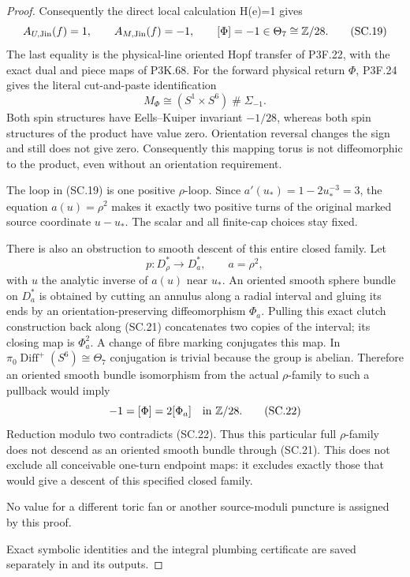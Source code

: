 \begin{proof}
Consequently the direct local calculation H(e)=1 gives
\[
 A_{U,\rm Jin}(f)=1,\qquad A_{M,\rm Jin}(f)=-1,
 \qquad[\Phi]=-1\in\Theta_7\cong\mathbb Z/28.          \tag{SC.19}
\]
The last equality is the physical-line oriented Hopf transfer of P3F.22, with the exact dual and piece maps of P3K.68. For the
forward physical return \(\Phi\), P3F.24 gives the literal cut-and-paste
identification
\[
 M_\Phi\cong(S^1\times S^6)\mathbin{\#}\Sigma_{-1}.
                                                               \tag{SC.20}
\]
Both spin structures have Eells--Kuiper invariant \(-1/28\), whereas
both spin structures of the product have value zero. Orientation
reversal changes the sign and still does not give zero. Consequently
this mapping torus is not diffeomorphic to the product, even without
an orientation requirement.

The loop in (SC.19) is one positive \(\rho\)-loop. Since
\(a'(u_*)=1-2u_*^{-3}=3\), the equation \(a(u)=\rho^2\) makes it
exactly two positive turns of the original marked source coordinate
\(u-u_*\). The scalar and all finite-cap choices stay fixed.

There is also an obstruction to smooth descent of this entire closed
family. Let
\[
 p:D_\rho^*\longrightarrow D_a^*,\qquad a=\rho^2,
                                                               \tag{SC.21}
\]
with \(u\) the analytic inverse of \(a(u)\) near \(u_*\). An oriented
smooth sphere bundle on \(D_a^*\) is obtained by cutting an annulus
along a radial interval and gluing its ends by an orientation-preserving
diffeomorphism \(\Phi_a\). Pulling this exact clutch construction back
along (SC.21) concatenates two copies of the interval; its closing map
is \(\Phi_a^2\). A change of fibre marking conjugates this map.
In \(\pi_0\operatorname{Diff}^+(S^6)\cong\Theta_7\) conjugation is
trivial because the group is abelian. Therefore an oriented smooth
bundle isomorphism from the actual \(\rho\)-family to such a pullback
would imply
\[
                -1=[\Phi]=2[\Phi_a]\quad\hbox{in }\mathbb Z/28.
                                                               \tag{SC.22}
\]
Reduction modulo two contradicts (SC.22). Thus this particular full
\(\rho\)-family does not descend as an oriented smooth bundle through
(SC.21). This does not exclude all conceivable one-turn endpoint maps:
it excludes exactly those that would give a descent of this specified
closed family.

No value for a different toric fan or another source-moduli puncture
is assigned by this proof.

Exact symbolic identities and the integral plumbing certificate are
saved separately in  and its outputs.

\end{proof}
